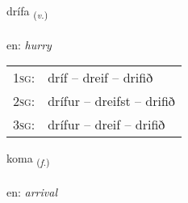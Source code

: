 \documentclass[frontgrid, backgrid]{flacards}\usepackage[]{graphicx}\usepackage[]{xcolor}
\begin{document}
\renewcommand{\flhead}{\vskip5pt \fboxsep=0pt {\small\bfseries\footnotesize Sagnorð | Verb}}
\renewcommand{\fcfoot}{\vskip5pt \fboxsep=0pt \hspace{2pt}{\small\bfseries\footnotesize 3K}}

\renewcommand{\blhead}{\vskip5pt {\small\bfseries\footnotesize Sagnorð | Verb }}
\renewcommand{\bcfoot}{\vskip5pt \hspace{2pt}{\small\bfseries\footnotesize 3K}}


{drífa \small{\textsubscript{(\textit{v.})}} \\[1ex] %
\textphonetic{[triːva]} \\
en: \emph{hurry} \\  [2ex]
\renewcommand*{\arraystretch}{0.8}
\begin{tabular}{p{1cm}l}
\textsc{1sg}: & dríf -- dreif -- drifið \\ 
\textsc{2sg}: & drífur -- dreifst -- drifið \\ 
\textsc{3sg}: & drífur -- dreif -- drifið \\ 
\end{tabular}
}

\renewcommand{\flhead}{\vskip5pt \fboxsep=0pt {\small\bfseries\footnotesize Nafnorð | Noun}}
\renewcommand{\fcfoot}{\vskip5pt \fboxsep=0pt \hspace{2pt}{\small\bfseries\footnotesize 3K}}

\renewcommand{\blhead}{\vskip5pt {\small\bfseries\footnotesize Nafnorð | Noun }}
\renewcommand{\bcfoot}{\vskip5pt \hspace{2pt}{\small\bfseries\footnotesize 3K}}


{koma \small{\textsubscript{(\textit{f.})}} \\[1ex] %
\textphonetic{[kʰɔːma]} \\
en: \emph{arrival} \\  [2ex]
\renewcommand*{\arraystretch}{0.8}
}
\end{document}
